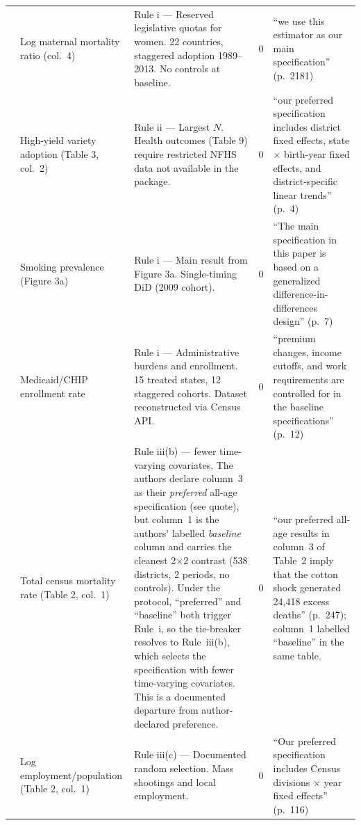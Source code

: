 \begin{small}
\begin{longtable}{p{2.2cm} p{3.0cm} p{5.5cm} p{0.8cm} p{4cm}}
\textcite{bhalotra2023maternal}
& Log maternal mortality ratio (col.~4)
& Rule i --- Reserved legislative quotas for women. 22 countries, staggered adoption 1989--2013. No controls at baseline.
& 0
& ``we use this estimator as our main specification'' (p.~2181) \\

\textcite{sekhri2024curse}
& High-yield variety adoption (Table 3, col.~2)
& Rule ii --- Largest $N$. Health outcomes (Table 9) require restricted NFHS data not available in the package.
& 0
& ``our preferred specification includes district fixed effects, state $\times$ birth-year fixed effects, and district-specific linear trends'' (p.~4) \\

\textcite{steffens2025smoking}
& Smoking prevalence (Figure 3a)
& Rule i --- Main result from Figure 3a. Single-timing DiD (2009 cohort).
& 0
& ``The main specification in this paper is based on a generalized difference-in-differences design'' (p.~7) \\

\textcite{arbogast2024burdens}
& Medicaid/CHIP enrollment rate
& Rule i --- Administrative burdens and enrollment. 15 treated states, 12 staggered cohorts. Dataset reconstructed via Census API.
& 0
& ``premium changes, income cutoffs, and work requirements are controlled for in the baseline specifications'' (p.~12) \\

\textcite{arthi2022recessions}
& Total census mortality rate (Table 2, col.~1)
& Rule iii(b) --- fewer time-varying covariates. The authors declare column~3 as their \emph{preferred} all-age specification (see quote), but column~1 is the authors' labelled \emph{baseline} column and carries the cleanest 2$\times$2 contrast (538 districts, 2 periods, no controls). Under the protocol, ``preferred'' and ``baseline'' both trigger Rule~i, so the tie-breaker resolves to Rule~iii(b), which selects the specification with fewer time-varying covariates. This is a documented departure from author-declared preference.
& 0
& ``our preferred all-age results in column~3 of Table~2 imply that the cotton shock generated 24,418 excess deaths'' (p.~247); column~1 labelled ``baseline'' in the same table. \\

\textcite{brodeur2025shootings}
& Log employment/population (Table 2, col.~1)
& Rule iii(c) --- Documented random selection. Mass shootings and local employment.
& 0
& ``Our preferred specification includes Census divisions $\times$ year fixed effects'' (p.~116) \\


\end{longtable}
\end{small}
